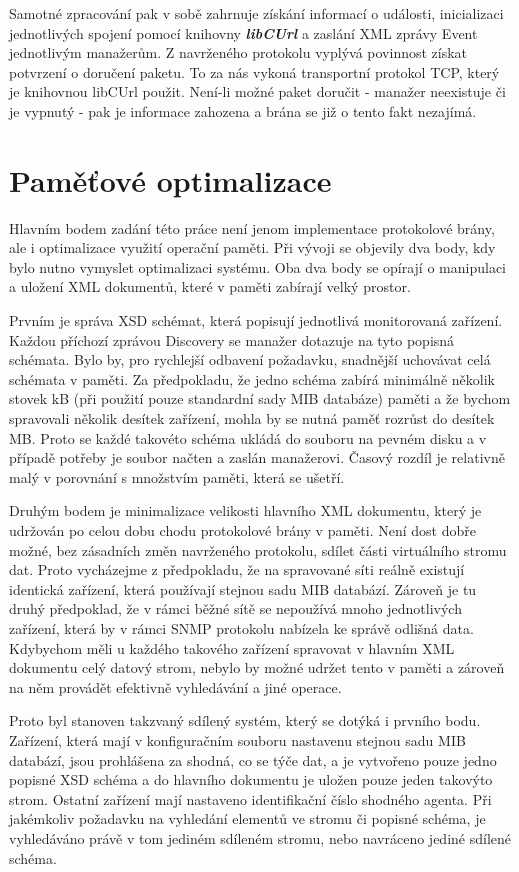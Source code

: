 Samotné zpracování pak v sobě zahrnuje získání informací o události, inicializaci jednotlivých spojení pomocí knihovny \textbf{\textit{libCUrl}} a zaslání XML zprávy
Event jednotlivým manažerům. Z navrženého protokolu vyplývá povinnost získat potvrzení o doručení paketu. To za nás vykoná transportní protokol TCP, který je knihovnou libCUrl
použit. Není-li možné paket doručit - manažer neexistuje či je vypnutý - pak je informace zahozena a brána se již o tento fakt nezajímá.


\section{Paměťové optimalizace}
Hlavním bodem zadání této práce není jenom implementace protokolové brány, ale i optimalizace využití operační paměti. Při vývoji se objevily dva body, kdy bylo nutno 
vymyslet optimalizaci systému. Oba dva body se opírají o manipulaci a uložení XML dokumentů, které v paměti zabírají velký prostor.

Prvním je správa XSD schémat, která popisují jednotlivá monitorovaná zařízení. Každou příchozí zprávou Discovery se manažer dotazuje na tyto popisná schémata. Bylo by, pro 
rychlejší odbavení požadavku, snadnější uchovávat celá schémata v paměti. Za předpokladu, že jedno schéma zabírá minimálně několik stovek kB (při použití pouze standardní
sady MIB databáze) paměti a že bychom spravovali několik desítek zařízení, mohla by se nutná paměť rozrůst do desítek MB. Proto se každé takovéto schéma ukládá do
souboru na pevném disku a v případě potřeby je soubor načten a zaslán manažerovi. Časový rozdíl je relativně malý v porovnání s množstvím paměti, která se ušetří.

Druhým bodem je minimalizace velikosti hlavního XML dokumentu, který je udržován po celou dobu chodu protokolové brány v paměti. Není dost dobře možné, bez zásadních změn
navrženého protokolu, sdílet části virtuálního stromu dat. Proto vycházejme z předpokladu, že na spravované síti reálně existují identická zařízení, která používají
stejnou sadu MIB databází. Zároveň je tu druhý předpoklad, že v rámci běžné sítě se nepoužívá mnoho jednotlivých zařízení, která by v rámci SNMP protokolu nabízela ke správě odlišná data.
Kdybychom měli u každého takového zařízení spravovat v hlavním XML dokumentu celý datový strom, nebylo by možné udržet tento v paměti a zároveň na něm provádět
efektivně vyhledávání a jiné operace.

Proto byl stanoven takzvaný sdílený systém, který se dotýká i prvního bodu. Zařízení, která mají v konfiguračním souboru nastavenu stejnou sadu MIB databází, jsou prohlášena za shodná, co se týče
dat, a je vytvořeno pouze jedno popisné XSD schéma a do hlavního dokumentu je uložen pouze jeden takovýto strom. Ostatní zařízení mají nastaveno identifikační číslo shodného agenta.
Při jakémkoliv požadavku na vyhledání elementů ve stromu či popisné schéma, je vyhledáváno právě v tom jediném sdíleném stromu, nebo navráceno jediné sdílené schéma.

